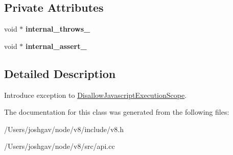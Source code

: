 \subsection*{Private Attributes}
\begin{DoxyCompactItemize}
\item 
void $\ast$ {\bfseries internal\+\_\+throws\+\_\+}\hypertarget{classv8_1_1_isolate_1_1_allow_javascript_execution_scope_a991c6fdbad58aae983e2107de2423f80}{}\label{classv8_1_1_isolate_1_1_allow_javascript_execution_scope_a991c6fdbad58aae983e2107de2423f80}

\item 
void $\ast$ {\bfseries internal\+\_\+assert\+\_\+}\hypertarget{classv8_1_1_isolate_1_1_allow_javascript_execution_scope_a5ef196e5ce1c7c3602b3bbe4674dab3c}{}\label{classv8_1_1_isolate_1_1_allow_javascript_execution_scope_a5ef196e5ce1c7c3602b3bbe4674dab3c}

\end{DoxyCompactItemize}


\subsection{Detailed Description}
Introduce exception to \hyperlink{classv8_1_1_isolate_1_1_disallow_javascript_execution_scope}{Disallow\+Javascript\+Execution\+Scope}. 

The documentation for this class was generated from the following files\+:\begin{DoxyCompactItemize}
\item 
/\+Users/joshgav/node/v8/include/v8.\+h\item 
/\+Users/joshgav/node/v8/src/api.\+cc\end{DoxyCompactItemize}
